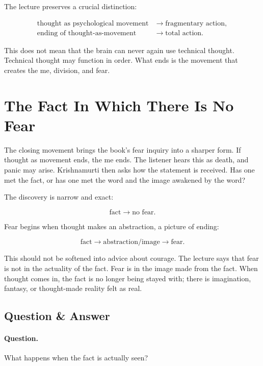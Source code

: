 \documentclass[11pt,oneside]{book}
\begin{document}
The lecture preserves a crucial distinction:

\begin{align}
\text{thought as psychological movement}
&\longrightarrow
\text{fragmentary action},\\
\text{ending of thought-as-movement}
&\longrightarrow
\text{total action}.
\end{align}

This does not mean that the brain can never again use technical thought. Technical thought may function in order. What ends is the movement that creates the me, division, and fear.

\section{The Fact In Which There Is No Fear}

The closing movement brings the book's fear inquiry into a sharper form. If thought as movement ends, the me ends. The listener hears this as death, and panic may arise. Krishnamurti then asks how the statement is received. Has one met the fact, or has one met the word and the image awakened by the word?

The discovery is narrow and exact:

\begin{equation}
\text{fact} \longrightarrow \text{no fear}.
\end{equation}

Fear begins when thought makes an abstraction, a picture of ending:

\begin{equation}
\text{fact}
\longrightarrow
\text{abstraction/image}
\longrightarrow
\text{fear}.
\end{equation}

This should not be softened into advice about courage. The lecture says that fear is not in the actuality of the fact. Fear is in the image made from the fact. When thought comes in, the fact is no longer being stayed with; there is imagination, fantasy, or thought-made reality felt as real.

\subsection{Question \& Answer}

\paragraph{Question.}
What happens when the fact is actually seen?
\end{document}
